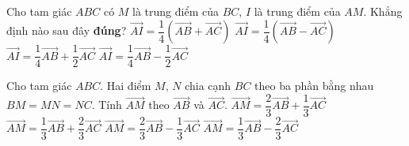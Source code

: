 \begin{ex}%
	Cho tam giác $ABC$ có $M$ là trung điểm của $BC$, $I$ là trung điểm của $AM$. Khẳng định nào sau đây \textbf{đúng}?
	\choice
	{\True $\overrightarrow{AI}=\dfrac{1}{4}\left(\overrightarrow{AB}+\overrightarrow{AC}\right)$}
	{$\overrightarrow{AI}=\dfrac{1}{4}\left(\overrightarrow{AB}-\overrightarrow{AC}\right)$}
	{$\overrightarrow{AI}=\dfrac{1}{4}\overrightarrow{AB}+\dfrac{1}{2}\overrightarrow{AC}$}
	{$\overrightarrow{AI}=\dfrac{1}{4}\overrightarrow{AB}-\dfrac{1}{2}\overrightarrow{AC}$}
\end{ex}

\begin{ex}%
	Cho tam giác $ABC$. Hai điểm $M$, $N$ chia cạnh $BC$ theo ba phần bằng nhau $BM=MN=NC$. Tính $\overrightarrow{AM}$ theo $\overrightarrow{AB}$ và $\overrightarrow{AC}$.
	\choice
	{\True $\overrightarrow{AM}=\dfrac{2}{3}\overrightarrow{AB}+\dfrac{1}{3}\overrightarrow{AC}$}
	{$\overrightarrow{AM}=\dfrac{1}{3}\overrightarrow{AB}+\dfrac{2}{3}\overrightarrow{AC}$}
	{$\overrightarrow{AM}=\dfrac{2}{3}\overrightarrow{AB}-\dfrac{1}{3}\overrightarrow{AC}$}
	{$\overrightarrow{AM}=\dfrac{1}{3}\overrightarrow{AB}-\dfrac{2}{3}\overrightarrow{AC}$}
\end{ex}

